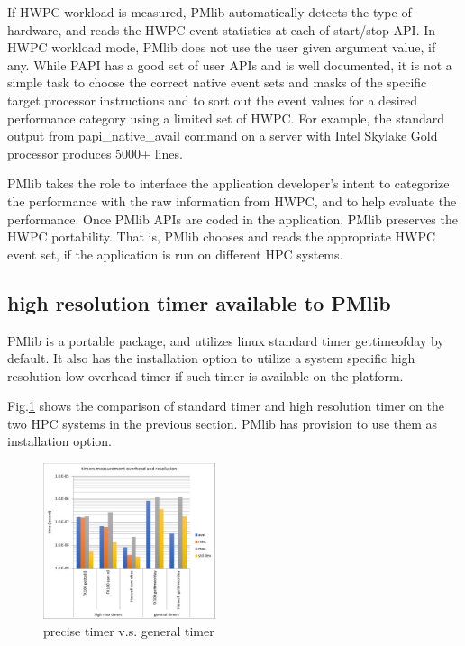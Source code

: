 \documentclass[conference]{IEEEtran}
\begin{document}
If HWPC workload is measured,
PMlib automatically detects the type of hardware, and reads the HWPC
event statistics at each of start/stop API.
In HWPC workload mode, PMlib does not use the user given argument value,
if any.
While PAPI has a good set of user APIs and is well documented,
it is not a simple task to choose the correct native event sets and masks
of the specific target processor instructions and to sort out the event
values for a desired performance category using a limited set of HWPC.
For example,
the standard output from papi\_native\_avail command on a server with
Intel Skylake Gold processor produces 5000+ lines.

PMlib takes the role to interface the application developer's intent to
categorize the performance with the raw information from HWPC, and to
help evaluate the performance.
Once PMlib APIs are coded in the application, PMlib preserves the HWPC
portability. That is, PMlib chooses and reads the appropriate HWPC event
set, if the application is run on different HPC systems.


\subsection{high resolution timer available to PMlib}
PMlib is a portable package, and utilizes linux standard timer
gettimeofday by default. It also has the installation option to utilize
a system specific high resolution low overhead timer if such timer is
available on the platform.

Fig.\ref{fig:precise-timer} shows the comparison of standard timer and
high resolution timer on the two HPC systems in the previous section.
PMlib has provision to use them as installation option.
\begin{figure}[tb]
\centering
\includegraphics[width=0.45\textwidth]{figs/precise-timer.pdf}
\caption{precise timer v.s. general timer}
\label{fig:precise-timer}
\end{figure}
\end{document}
